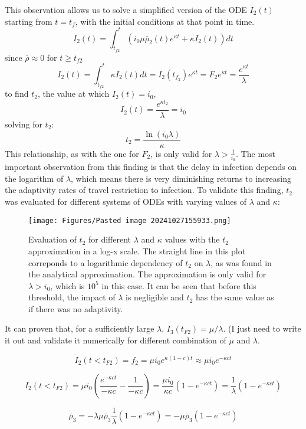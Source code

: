\documentclass{article}
\begin{document}
This observation allows us to solve a simplified version of the ODE $\dot I_2(t)$ starting from $t=t_f$, with the initial conditions at that point in time.
$$ I_2(t) = \int_{t_{f2}}^t \left(i_{0} \mu \bar \rho_{2}{(t)} e^{\kappa t} + \kappa I_{2}{\left(t \right)}\right) dt$$
since $\bar \rho \approx 0$ for $t\ge t_{f2}$ 
$$I_2(t) = \int_{t_{f2}}^t  \kappa I_{2}{\left(t \right)} dt = I_2(t_{f_2})e^{\kappa t} = F_2 e^{\kappa t} =\frac{e^{\kappa t}}{\lambda}$$
to find $t_2$, the value at which $I_2(t)=i_0$, 
$$I_2(t) =\frac{e^{\kappa t_2}}{\lambda}=i_0$$
solving for $t_2$:
$$t_2=\frac{\ln(i_0 \lambda)}{\kappa}$$
This relationship, as with the one for $F_2$, is only valid for $\lambda> \frac{1}{i_0}$. The most important observation from this finding is that the delay in infection depends on the logarithm of $\lambda$, which means there is very diminishing returns to increasing the adaptivity rates of travel restriction to infection. To validate this finding, $t_2$ was evaluated for different systems of ODEs with varying values of $\lambda$ and $\kappa$:

\begin{figure}[h!]
    \centering
    \texttt{[image: Figures/Pasted image 20241027155933.png]}
    \caption{\small Evaluation of $t_2$ for different $\lambda$ and $\kappa$ values with the $t_2$ approximation in a log-x scale. The straight line in this plot correponds to a logarithmic dependency of $t_2$ on $\lambda$, as was found in the analytical approximation. The approximation is only valid for $\lambda > i_0$, which is $10^5$ in this case. It can be seen that before this threshold, the impact of $\lambda$ is negligible and $t_2$ has the same value as if there was no adaptivity.}
\end{figure}

It can proven that, for a sufficiently large $\lambda$, $I_3(t_{F2})=\mu/\lambda$. (I just need to write it out and validate it numerically for different combination of $\mu$ and $\lambda$.

$$\dot I_2(t<t_{F2}) = f_2 = \mu i_0 e^{\kappa (1-c) t} \approx \mu i_0 e^{-\kappa c t}$$

$$I_2(t<t_{F2}) = \mu i_0 \left( \frac{e^{-\kappa c t}}{-\kappa c} - \frac{1}{-\kappa c} \right) = \frac{\mu i_0}{\kappa c}\left(1 - e^{-\kappa c t}\right) = \frac{1}{\lambda}\left(1-e^{-\kappa c t}\right) $$

$$\dot{\bar{\rho}}_3 = - \lambda \mu \bar{\rho}_3 \frac{1}{\lambda}\left(1 - e^{-\kappa c t}\right) =  - \mu \bar{\rho}_3\left(1 - e^{-\kappa c t}\right)$$
\end{document}
